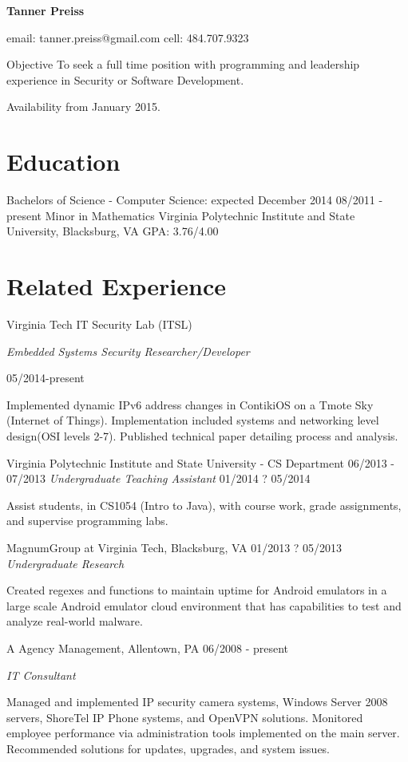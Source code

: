 \documentclass{tpreiss_cv}
\begin{document}
\textbf{\Large{Tanner Preiss}}

email: tanner.preiss@gmail.com
cell: 484.707.9323

Objective   To seek a full time position with programming and leadership experience in Security or Software Development.

Availability from January 2015.

\section{Education}
Bachelors of Science - Computer Science: expected December 2014 	                                 08/2011 - present
	Minor in Mathematics
	Virginia Polytechnic Institute and State University, Blacksburg, VA
	GPA: 3.76/4.00     			

\section{Related Experience}
Virginia Tech IT Security Lab (ITSL) 
        
\textit{Embedded Systems Security Researcher/Developer} 

05/2014-present

Implemented dynamic IPv6 address changes in ContikiOS on a Tmote Sky (Internet of Things). Implementation included systems and networking level design(OSI levels 2-7). Published technical paper detailing process and analysis. 

Virginia Polytechnic Institute and State University - CS Department 			         06/2013 - 07/2013
\textit{Undergraduate Teaching Assistant}	         01/2014 ? 05/2014

Assist students, in CS1054 (Intro to Java), with course work, grade assignments, and supervise programming labs.

MagnumGroup at Virginia Tech, Blacksburg, VA			         01/2013 ? 05/2013
\textit{Undergraduate Research}
 
Created regexes and functions to maintain uptime for Android emulators in a large scale Android emulator cloud environment that has capabilities to test and analyze real-world malware.

A Agency Management, Allentown, PA			           06/2008 - present

\textit{IT Consultant}

Managed and implemented IP security camera systems, Windows Server 2008 servers, ShoreTel IP Phone systems, and OpenVPN solutions. Monitored employee performance via administration tools implemented on    the main server. Recommended solutions for updates, upgrades, and system issues.
\end{document}
